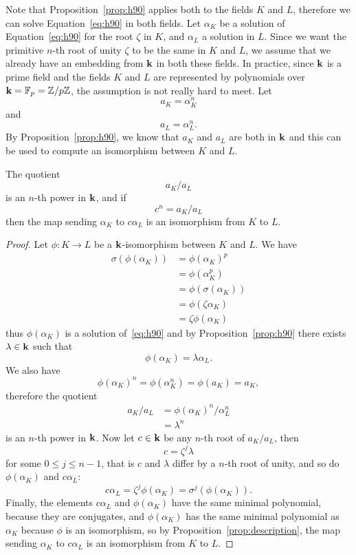 Note that Proposition~\ref{prop:h90} applies both to the fields $K$ and $L$,
therefore we can solve Equation~\eqref{eq:h90} in both fields. Let $\alpha_K$ be a
solution of Equation~\eqref{eq:h90} for the root $\zeta$ in $K$, and $\alpha_L$
a solution in $L$. Since we want the primitive $n$-th root of unity $\zeta$ to
be the same in $K$ and $L$, we assume that we already have an embedding from
$\mathbf{k}$ in both these fields. In practice, since $\mathbf{k}$ is a
prime field and the fields $K$ and $L$ are represented by polynomials over
$\mathbf{k} = \mathbb{F}_p=\mathbb{Z}/p\mathbb{Z}$, the assumption is not really
hard to meet. Let
\[
  a_K = \alpha_K^n
\]
and
\[
  a_L = \alpha_L^n.
\]
By Proposition~\ref{prop:h90}, we know that $a_K$ and $a_L$ are both in $\mathbf{k}$ and
this can be used to compute an isomorphism between $K$ and $L$.
\begin{prop}
  \label{prop:allombert-simple}
 The quotient
 \[
   a_K/a_L
 \]
 is an $n$-th power in $\mathbf{k}$, and if
 \[
   c^n = a_K/a_L
 \]
 then the map sending $\alpha_K$ to $c\alpha_L$ is an isomorphism from $K$ to $L$.
\end{prop}
\begin{proof}
  Let $\phi:K\to L$ be a $\mathbf{k}$-isomorphism between $K$ and $L$. We have
  \begin{align*}
    \sigma(\phi(\alpha_K)) &= \phi(\alpha_K)^p\\
    &= \phi(\alpha_K^p)\\
    &= \phi(\sigma(\alpha_K))\\
    &= \phi(\zeta\alpha_K)\\
    &= \zeta\phi(\alpha_K)
  \end{align*}
  thus $\phi(\alpha_K)$ is a solution of~\eqref{eq:h90} and by
  Proposition~\ref{prop:h90} there exists $\lambda\in\mathbf{k}$ such that
  \[
    \phi(\alpha_K) = \lambda\alpha_L.
  \]
  We also have
  \[
    \phi(\alpha_K)^n = \phi(\alpha_K^n) = \phi(a_K) = a_K,
  \]
  therefore the quotient
  \begin{align*}
    a_K/a_L &= \phi(\alpha_K)^n/\alpha_L^n\\
    &= \lambda^{n}
  \end{align*}
  is an $n$-th power in $\mathbf{k}$. Now let $c\in\mathbf{k}$ be any $n$-th root of $a_K/a_L$,
  then
  \[
    c = \zeta^j\lambda
  \]
  for some $0\leq j\leq n-1$, that is $c$ and $\lambda$ differ by a $n$-th root
  of unity, and so do $\phi(\alpha_K)$ and $c\alpha_L$:
  \[
    c\alpha_L = \zeta^j\phi(\alpha_K) = \sigma^j(\phi(\alpha_K)).
  \]
  Finally, the elements $c\alpha_L$ and $\phi(\alpha_K)$ have the same minimal
  polynomial, because they are conjugates, and $\phi(\alpha_K)$ has the same
  minimal polynomial as $\alpha_K$ because $\phi$ is an isomorphism, so by
  Proposition~\ref{prop:description}, the map sending $\alpha_K$ to $c\alpha_L$ is an
  isomorphism from $K$ to $L$.
\end{proof}
